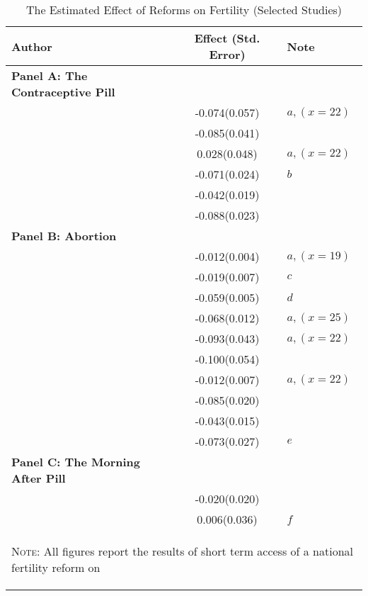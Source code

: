 \begin{table}[htpb!]
\caption{The Estimated Effect of Reforms on Fertility (Selected Studies)}
\label{TEENtab:lit}
\begin{tabular}{lcl} \toprule
Author & Effect (Std. Error) & Note \\ \midrule
\textbf{Panel A: The Contraceptive Pill} &&\\
\citet{Bailey2006}            & -0.074(0.057) & $a,(x=22)$  \\
\citet{Guldi2008}             & -0.085(0.041) &             \\
\citet{Bailey2009}            & 0.028(0.048)  & $a,(x=22)$  \\
\citet{KearnerLevine2009}     & -0.071(0.024) & $b$         \\
\citet{Bailey2012}            & -0.042(0.019) &             \\
\citet{OltmansHungerman2012}  & -0.088(0.023) &             \\
\textbf{Panel B: Abortion}&&\\
\citet{AngristEvans1996}      & -0.012(0.004) & $a,(x=19)$  \\
\citet{Levineetal1996}        & -0.019(0.007) & $c$         \\
\citet{Gruberetal1999}        & -0.059(0.005) & $d$         \\
\citet{Ananatetal2007}        & -0.068(0.012) & $a,(x=25)$  \\
\citet{Bailey2006}            & -0.093(0.043) & $a,(x=22)$  \\
\citet{Guldi2008}             & -0.100(0.054) &             \\
\citet{Bailey2009}            & -0.012(0.007) & $a,(x=22)$  \\
\citet{Ananatetal2009}        & -0.085(0.020) &             \\
\citet{OltmansHungerman2012}  & -0.043(0.015) &             \\
\citet{Valente2014}           & -0.073(0.027) & $e$         \\
\textbf{Panel C: The Morning After Pill}\\
\citet{Grossetal2014}         & -0.020(0.020) &             \\
\citet{Durrance2013}          & 0.006(0.036)  & $f$         \\
\bottomrule
\multicolumn{3}{p{11.2cm}}{\begin{footnotesize}\textsc{Note:} All figures 
report the results of short term access of a national fertility reform on 

\end{footnotesize}}
\end{tabular}
\end{table}
